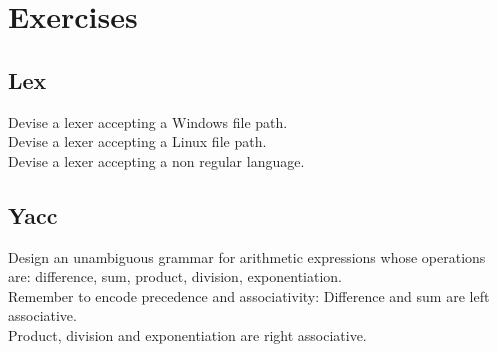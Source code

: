 \chapter{Exercises}
\section{Lex}

Devise a lexer accepting a Windows file path.\\
Devise a lexer accepting a Linux file path.\\
Devise a lexer accepting a non regular language.\\

\section{Yacc}

Design an unambiguous grammar for arithmetic expressions whose
operations are: difference, sum, product, division, exponentiation.\\
Remember to encode precedence and associativity:
Difference and sum are left associative.\\
Product, division and exponentiation are right associative.\\
